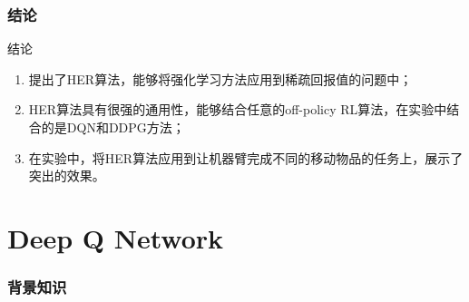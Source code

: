 \documentclass[10pt]{beamer}
\begin{document}
	\section{结论}
	
	\begin{frame}{结论}
		\begin{enumerate}
			\item 提出了HER算法，能够将强化学习方法应用到稀疏回报值的问题中；
			\item HER算法具有很强的通用性，能够结合任意的off-policy RL算法，在实验中结合的是DQN和DDPG方法；
			\item 在实验中，将HER算法应用到让机器臂完成不同的移动物品的任务上，展示了突出的效果。
		\end{enumerate}
	\end{frame}
		
	\part{Deep Q Network}\label{part:dqn}
	
	\section{背景知识}
	
\end{document}
